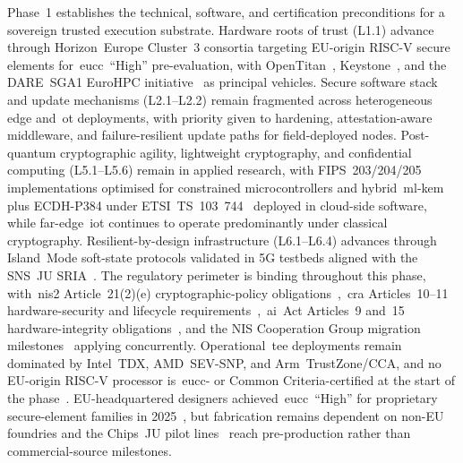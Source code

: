 \documentclass{ieeeaccess}
\begin{document}
Phase~1 establishes the technical, software, and certification preconditions for a sovereign trusted execution substrate. Hardware roots of trust (L1.1) advance through Horizon~Europe Cluster~3 consortia targeting EU-origin RISC-V secure elements for~\gls{eucc}~``High'' pre-evaluation, with OpenTitan~\cite{opentitan2024}, Keystone~\cite{keystone2020}, and the DARE~SGA1 EuroHPC initiative~\cite{eurohpcdare2025} as principal vehicles. Secure software stack and update mechanisms (L2.1--L2.2) remain fragmented across heterogeneous edge and~\gls{ot} deployments, with priority given to hardening, attestation-aware middleware, and failure-resilient update paths for field-deployed nodes. Post-quantum cryptographic agility, lightweight cryptography, and confidential computing (L5.1--L5.6) remain in applied research, with FIPS~203/204/205~\cite{nistfips203,nistfips204,nistfips205} implementations optimised for constrained microcontrollers and hybrid~\gls{ml-kem} plus ECDH-P384 under ETSI~TS~103~744~\cite{etsiqshybrid} deployed in cloud-side software, while far-edge~\gls{iot} continues to operate predominantly under classical cryptography. Resilient-by-design infrastructure (L6.1--L6.4) advances through Island~Mode soft-state protocols validated in 5G testbeds aligned with the SNS~JU SRIA~\cite{snsju2023}. The regulatory perimeter is binding throughout this phase, with~\gls{nis2} Article~21(2)(e) cryptographic-policy obligations~\cite{eunis2},~\gls{cra} Articles~10--11 hardware-security and lifecycle requirements~\cite{eucra2024},~\gls{ai}~Act Articles~9 and~15 hardware-integrity obligations~\cite{euaiact}, and the NIS Cooperation Group migration milestones~\cite{niscg2025pqc} applying concurrently. Operational~\gls{tee} deployments remain dominated by Intel~TDX, AMD~SEV-SNP, and Arm~TrustZone/CCA, and no EU-origin RISC-V processor is~\gls{eucc}- or Common Criteria-certified at the start of the phase~\cite{Munoz2023-pw}. EU-headquartered designers achieved~\gls{eucc}~``High'' for proprietary secure-element families in 2025~\cite{enisaeucc2025}, but fabrication remains dependent on non-EU foundries and the Chips~JU pilot lines~\cite{euchipsact} reach pre-production rather than commercial-source milestones.
\end{document}
